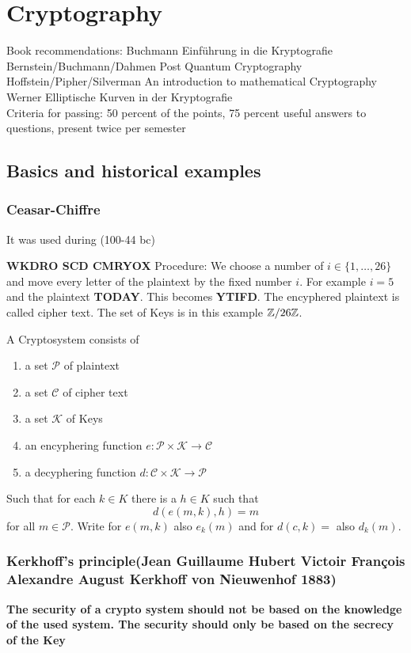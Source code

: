 \chapter{Cryptography}
Book recommendations: 
Buchmann Einführung in die Kryptografie\\
Bernstein/Buchmann/Dahmen Post Quantum Cryptography\\
Hoffstein/Pipher/Silverman An introduction to mathematical Cryptography\\
Werner Elliptische Kurven in der Kryptografie\\
Criteria for passing: 50 percent of the points, 75 percent useful answers to questions, present twice per semester\\
\section{Basics and historical examples}
\subsection{Ceasar-Chiffre}
It was used during (100-44 bc)
\begin{Bsp}
\textbf{WKDRO SCD CMRYOX}
Procedure: We choose a number of \(i \in\{1,\dots,26\}\) and move every letter of the plaintext by the fixed number \(i\).
For example \(i=5\) and the plaintext \textbf{TODAY}. This becomes \textbf{YTIFD}.
The encyphered plaintext is called cipher text.
The set of Keys is in this example \(\mathbb{Z}/26\mathbb{Z}\).
\end{Bsp}
\begin{Def}[Cryptosystem]
A Cryptosystem consists of 
\begin{enumerate}
\item a set \(\mathcal{P}\) of plaintext
\item a set \(\mathcal{C}\) of cipher text
\item a set \(\mathcal{K}\) of Keys
\item an encyphering function \(e\colon \mathcal{P}\times\mathcal{K}\to\mathcal{C}\)
\item a decyphering function \(d\colon \mathcal{C\times K\to P}\)
\end{enumerate}
Such that for each \(k\in K\) there is a \(h\in K\) such that
\[d(e(m,k),h)=m\] for all \(m\in \mathcal{P}\).
Write for \(e(m,k)\) also \(e_k(m)\) and for \(d(c,k)=\) also \(d_k(m)\).
\end{Def}
\subsection{Kerkhoff’s principle(Jean Guillaume Hubert Victoir François Alexandre August Kerkhoff von Nieuwenhof 1883)}
\textbf{The security of a crypto system should not be based on the knowledge of the used system. The security should only be based on the secrecy of the Key}
